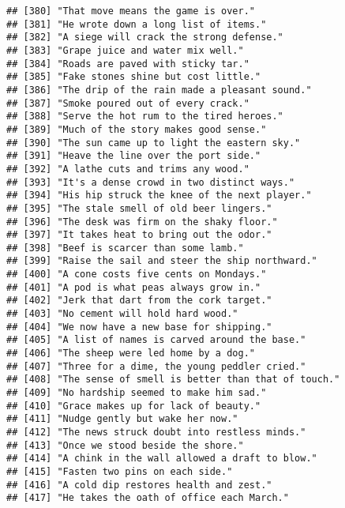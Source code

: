 \documentclass[
]{article}
\begin{document}
\begin{verbatim}
## [380] "That move means the game is over."                        
## [381] "He wrote down a long list of items."                      
## [382] "A siege will crack the strong defense."                   
## [383] "Grape juice and water mix well."                          
## [384] "Roads are paved with sticky tar."                         
## [385] "Fake stones shine but cost little."                       
## [386] "The drip of the rain made a pleasant sound."              
## [387] "Smoke poured out of every crack."                         
## [388] "Serve the hot rum to the tired heroes."                   
## [389] "Much of the story makes good sense."                      
## [390] "The sun came up to light the eastern sky."                
## [391] "Heave the line over the port side."                       
## [392] "A lathe cuts and trims any wood."                         
## [393] "It's a dense crowd in two distinct ways."                 
## [394] "His hip struck the knee of the next player."              
## [395] "The stale smell of old beer lingers."                     
## [396] "The desk was firm on the shaky floor."                    
## [397] "It takes heat to bring out the odor."                     
## [398] "Beef is scarcer than some lamb."                          
## [399] "Raise the sail and steer the ship northward."             
## [400] "A cone costs five cents on Mondays."                      
## [401] "A pod is what peas always grow in."                       
## [402] "Jerk that dart from the cork target."                     
## [403] "No cement will hold hard wood."                           
## [404] "We now have a new base for shipping."                     
## [405] "A list of names is carved around the base."               
## [406] "The sheep were led home by a dog."                        
## [407] "Three for a dime, the young peddler cried."               
## [408] "The sense of smell is better than that of touch."         
## [409] "No hardship seemed to make him sad."                      
## [410] "Grace makes up for lack of beauty."                       
## [411] "Nudge gently but wake her now."                           
## [412] "The news struck doubt into restless minds."               
## [413] "Once we stood beside the shore."                          
## [414] "A chink in the wall allowed a draft to blow."             
## [415] "Fasten two pins on each side."                            
## [416] "A cold dip restores health and zest."                     
## [417] "He takes the oath of office each March."                  

\end{verbatim}
\end{document}
